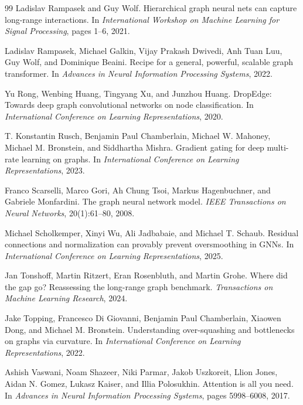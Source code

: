 \begin{thebibliography}{99}
Ladislav Rampasek and Guy Wolf.
\newblock Hierarchical graph neural nets can capture long-range interactions.
\newblock In \emph{International Workshop on Machine Learning for Signal Processing}, pages 1--6, 2021.

Ladislav Rampasek, Michael Galkin, Vijay Prakash Dwivedi, Anh Tuan Luu, Guy Wolf, and Dominique Beaini.
\newblock Recipe for a general, powerful, scalable graph transformer.
\newblock In \emph{Advances in Neural Information Processing Systems}, 2022.

Yu Rong, Wenbing Huang, Tingyang Xu, and Junzhou Huang.
\newblock DropEdge: Towards deep graph convolutional networks on node classification.
\newblock In \emph{International Conference on Learning Representations}, 2020.

T. Konstantin Rusch, Benjamin Paul Chamberlain, Michael W. Mahoney, Michael M. Bronstein, and Siddhartha Mishra.
\newblock Gradient gating for deep multi-rate learning on graphs.
\newblock In \emph{International Conference on Learning Representations}, 2023.

Franco Scarselli, Marco Gori, Ah Chung Tsoi, Markus Hagenbuchner, and Gabriele Monfardini.
\newblock The graph neural network model.
\newblock \emph{IEEE Transactions on Neural Networks}, 20(1):61--80, 2008.

Michael Scholkemper, Xinyi Wu, Ali Jadbabaie, and Michael T. Schaub.
\newblock Residual connections and normalization can provably prevent oversmoothing in GNNs.
\newblock In \emph{International Conference on Learning Representations}, 2025.

Jan Tonshoff, Martin Ritzert, Eran Rosenbluth, and Martin Grohe.
\newblock Where did the gap go? Reassessing the long-range graph benchmark.
\newblock \emph{Transactions on Machine Learning Research}, 2024.

Jake Topping, Francesco Di Giovanni, Benjamin Paul Chamberlain, Xiaowen Dong, and Michael M. Bronstein.
\newblock Understanding over-squashing and bottlenecks on graphs via curvature.
\newblock In \emph{International Conference on Learning Representations}, 2022.

Ashish Vaswani, Noam Shazeer, Niki Parmar, Jakob Uszkoreit, Llion Jones, Aidan N. Gomez, Lukasz Kaiser, and Illia Polosukhin.
\newblock Attention is all you need.
\newblock In \emph{Advances in Neural Information Processing Systems}, pages 5998--6008, 2017.


\end{thebibliography}
